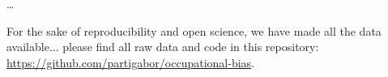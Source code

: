 \documentclass[11pt]{article}
\begin{document}
\dots

For the sake of reproducibility and open science, we have made all the data available... please find all raw data and code in this repository: \href{https://github.com/partigabor/occupational-bias}{https://github.com/partigabor/occupational-bias}.

\medskip





















\end{document}
